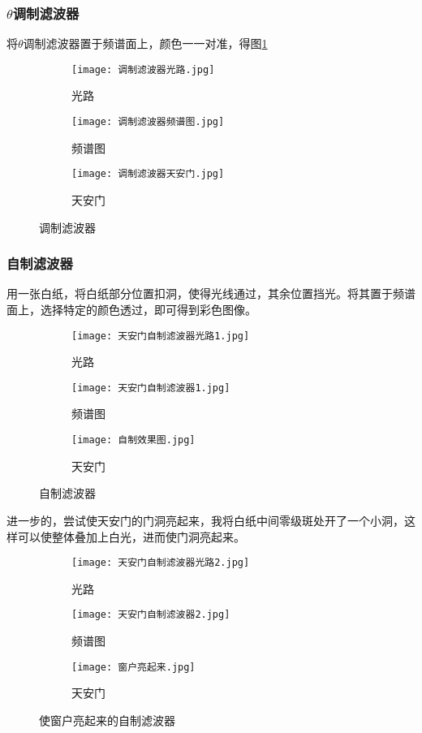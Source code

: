 \documentclass[11pt]{article}
\begin{document}
	\subsubsection{$\theta$调制滤波器}
	将$\theta$调制滤波器置于频谱面上，颜色一一对准，得图\ref{fig:调制滤波器}
	\begin{figure}[H]
		\centering
		\begin{subfigure}{0.3\textwidth}
			\texttt{[image: 调制滤波器光路.jpg]}
			\caption{光路}
		\end{subfigure}
		\begin{subfigure}{0.3\textwidth}
			\texttt{[image: 调制滤波器频谱图.jpg]}
			\caption{频谱图}
		\end{subfigure}
		\begin{subfigure}{0.3\textwidth}
			\texttt{[image: 调制滤波器天安门.jpg]}
			\caption{天安门}
		\end{subfigure}
		\caption{调制滤波器}
		\label{fig:调制滤波器}
	\end{figure}
	
	\subsubsection{自制滤波器}
	用一张白纸，将白纸部分位置扣洞，使得光线通过，其余位置挡光。将其置于频谱面上，选择特定的颜色透过，即可得到彩色图像。
	
	\begin{figure}[H]
		\centering
		\begin{subfigure}{0.3\textwidth}
			\texttt{[image: 天安门自制滤波器光路1.jpg]}
			\caption{光路}
		\end{subfigure}
		\begin{subfigure}{0.3\textwidth}
			\texttt{[image: 天安门自制滤波器1.jpg]}
			\caption{频谱图}
		\end{subfigure}
		\begin{subfigure}{0.3\textwidth}
			\texttt{[image: 自制效果图.jpg]}
			\caption{天安门}
		\end{subfigure}
		\caption{自制滤波器}
		\label{fig:自制滤波器1}
	\end{figure}
	
	进一步的，尝试使天安门的门洞亮起来，我将白纸中间零级斑处开了一个小洞，这样可以使整体叠加上白光，进而使门洞亮起来。
	
	\begin{figure}[H]
		\centering
		\begin{subfigure}{0.3\textwidth}
			\texttt{[image: 天安门自制滤波器光路2.jpg]}
			\caption{光路}
		\end{subfigure}
		\begin{subfigure}{0.3\textwidth}
			\texttt{[image: 天安门自制滤波器2.jpg]}
			\caption{频谱图}
		\end{subfigure}
		\begin{subfigure}{0.3\textwidth}
			\texttt{[image: 窗户亮起来.jpg]}
			\caption{天安门}
		\end{subfigure}
		\caption{使窗户亮起来的自制滤波器}
		\label{fig:自制滤波器2}
	\end{figure}
	
\end{document}

